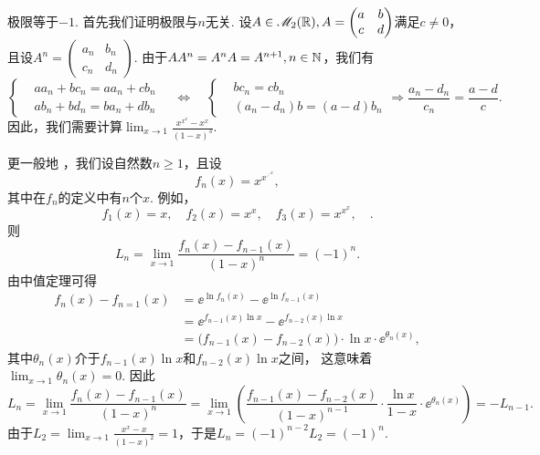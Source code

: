 \begin{solution}
  极限等于$-1$. 首先我们证明极限与$n$无关. 设$A\in\mathscr M_2(\mathbb R),A=\begin{pmatrix}
    a & b \\
    c & d
  \end{pmatrix}$满足$c\ne0$，且设$A^n=\begin{pmatrix}
    a_n & b_n \\
    c_n & d_n
  \end{pmatrix}$. 由于$AA^n=A^nA=A^{n+1},n\in\mathbb N$，我们有
  \[
    \left\{
      \begin{aligned}
        & aa_n + bc_n = aa_n + cb_n \\
        & ab_n + bd_n = ba_n + db_n
      \end{aligned}
    \right. \quad \Leftrightarrow \quad
      \left\{
        \begin{aligned}
          & bc_n = cb_n \\
          & (a_n-d_n)b = (a-d)b_n
        \end{aligned}
      \right.
    \Rightarrow \frac{a_n-d_n}{c_n} = \frac{a-d}c.
  \]
  因此，我们需要计算$\lim_{x\to1}\frac{x^{x^x}-x^x}{(1-x)^3}$.

  更一般地 \cite{20}，我们设自然数$n\ge1$，且设
  \[
    f_n(x) = x^{x^{\iddots^x}},
  \]
  其中在$f_n$的定义中有$n$个$x$. 例如，
  \[
    f_1(x) = x,\quad f_2(x) = x^x,\quad f_3(x) = x^{x^x},\quad .
  \]
  则
  \[
    L_n = \lim_{x\to1} \frac{f_n(x) - f_{n-1}(x)}{(1-x)^n} = (-1)^n.
  \]
  由中值定理可得
  \begin{align*}
    f_n(x) - f_{n=1}(x) & = \ee^{\ln f_n(x)} - \ee^{\ln f_{n-1}(x)} \\
    & = \ee^{f_{n-1}(x)\ln x} - \ee^{f_{n-2}(x) \ln x} \\
    & = \big(f_{n-1}(x) - f_{n-2}(x) \big)\cdot \ln x\cdot \ee^{\theta_n(x)},
  \end{align*}
  其中$\theta_n(x)$介于$f_{n-1}(x)\ln x$和$f_{n-2}(x)\ln x$之间， 这意味着$\lim_{x\to1}\theta_n(x)=0$. 因此
  \[
    L_n = \lim_{x\to1} \frac{f_n(x)-f_{n-1}(x)}{(1-x)^n} = \lim_{x\to1} \left( \frac{f_{n-1}(x) - f_{n-2}(x)}{(1-x)^{n-1}}\cdot \frac{\ln x}{1-x} \cdot \ee^{\theta_n(x)} \right) =- L_{n-1}.
  \]
  由于$L_2=\lim_{x\to1}\frac{x^x-x}{(1-x)^2}=1$，于是$L_n=(-1)^{n-2}L_2=(-1)^n$.
\end{solution}

